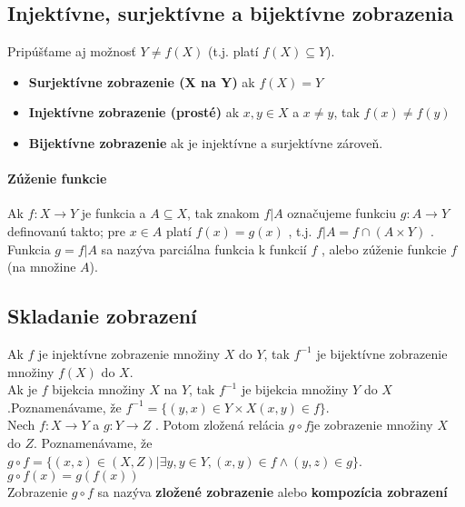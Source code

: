 	\subsection*{Injektívne, surjektívne a bijektívne zobrazenia}
		Pripúšťame aj možnosť $Y \neq f (X)$ (t.j. platí $f ( X ) \subseteq Y$).
		\begin{itemize}
			\item \textbf{Surjektívne zobrazenie (X na Y)} ak $f ( X ) = Y$
			\item \textbf{Injektívne zobrazenie (prosté)} ak $x, y \in X$ a $x \neq y$, tak $f ( x) \neq f ( y)$
			\item \textbf{Bijektívne zobrazenie} ak je injektívne a surjektívne zároveň.
		\end{itemize}

		\paragraph{Zúženie funkcie}
		Ak $f : X \rightarrow Y$ je funkcia a $A \subseteq X$, tak znakom $f | A$ označujeme funkciu $g : A \rightarrow Y$ definovanú takto; pre $x \in A$ platí $f (x) = g(x)$ , t.j. $f | A = f \cap ( A \times Y )$ . Funkcia $g = f | A$ sa nazýva parciálna funkcia k funkcií $f$ , alebo zúženie funkcie $f$ (na množine $A$).

	\subsection*{Skladanie zobrazení}
		Ak $f$ je injektívne zobrazenie množiny $X$ do $Y$, tak $f^{-1}$ je bijektívne zobrazenie množiny $f ( X )$ do $X$.\\

		Ak je $f$ bijekcia množiny $X$ na $Y$, tak $f^{-1}$ je bijekcia množiny $Y$ do $X$.Poznamenávame, že $f^{-1} = \{(y, x) \in Y \times X ( x,  y) \in f \}$.\\

		Nech $f : X \rightarrow Y$ a $g :Y \rightarrow Z$ . Potom zložená relácia $g \circ f$je zobrazenie množiny $X$ do $Z$. Poznamenávame, že $g \circ f = \{( x, z) \in ( X , Z ) | \exists y, y \in Y, ( x, y ) \in f \wedge ( y, z) \in g\}$.\\

		$g \circ f(x) = g(f(x))$\\

		Zobrazenie $g \circ f$ sa nazýva \textbf{zložené zobrazenie} alebo \textbf{kompozícia zobrazení}\\

